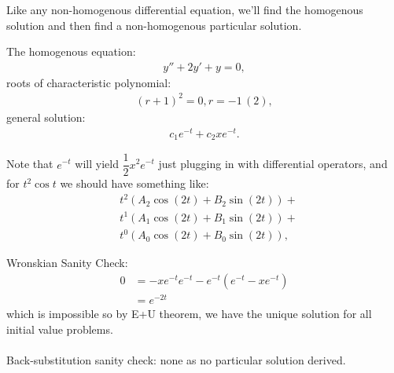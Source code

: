 \documentclass[11pt]{article}
\begin{document}
        \begin{remark}[Method.]
            Like any non-homogenous differential equation, we'll find the homogenous solution and then find a non-homogenous particular solution.
        \end{remark}
        \begin{solution}[Solution 2di]
            The homogenous equation:
            \begin{align}
                y'' + 2y' + y = 0,
            \end{align}
            roots of characteristic polynomial:
            \begin{align}
                (r+1)^2 = 0, r = -1 \, (2),
            \end{align}
            general solution:
            \begin{align}
                c_1e^{-t} + c_2xe^{-t}.
            \end{align}
        \end{solution}
        \begin{solution}
            Note that $e^{-t}$ will yield $\dfrac{1}{2}x^2e^{-t}$ just plugging in with differential operators,
            and for $t^2\cos t$ we should have something like:
            \begin{align}
                &t^2(A_2\cos(2t) + B_2\sin(2t)) + \\
                &t^1(A_1\cos(2t) + B_1\sin(2t)) + \\
                &t^0(A_0\cos(2t) + B_0\sin(2t)),
            \end{align}
        \end{solution}
        \begin{remark}[Footnotes.]
            Wronskian Sanity Check:
            \begin{align}
                0 &= -xe^{-t}e^{-t} - e^{-t}(e^{-t}-xe^{-t}) \\
                &= e^{-2t}
            \end{align}
            which is impossible so by E+U theorem, we have the unique solution for all initial value problems. \\~\\
            Back-substitution sanity check: none as no particular solution derived.
        \end{remark}
\end{document}
